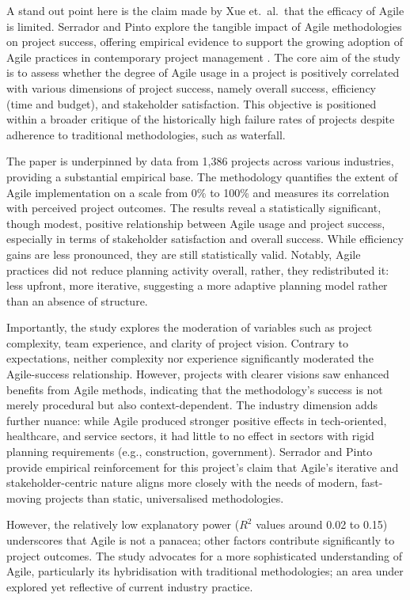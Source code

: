 \documentclass{report}
\begin{document}
A stand out point here is the claim made by Xue et.\ al.\ that the efficacy of Agile is limited. 
Serrador and Pinto explore the tangible impact of Agile methodologies on project success, offering empirical evidence to support the growing adoption of Agile practices in contemporary project management \parencite{serradorDoesAgileWork2015}. 
The core aim of the study is to assess whether the degree of Agile usage in a project is positively correlated with various dimensions of project success, namely overall success, efficiency (time and budget), and stakeholder satisfaction. 
This objective is positioned within a broader critique of the historically high failure rates of projects despite adherence to traditional methodologies, such as waterfall.

The paper is underpinned by data from 1,386 projects across various industries, providing a substantial empirical base. 
The methodology quantifies the extent of Agile implementation on a scale from 0\% to 100\% and measures its correlation with perceived project outcomes. 
The results reveal a statistically significant, though modest, positive relationship between Agile usage and project success, especially in terms of stakeholder satisfaction and overall success. 
While efficiency gains are less pronounced, they are still statistically valid. Notably, Agile practices did not reduce planning activity overall, rather, they redistributed it: less upfront, more iterative, suggesting a more adaptive planning model rather than an absence of structure.

Importantly, the study explores the moderation of variables such as project complexity, team experience, and clarity of project vision. 
Contrary to expectations, neither complexity nor experience significantly moderated the Agile-success relationship. 
However, projects with clearer visions saw enhanced benefits from Agile methods, indicating that the methodology's success is not merely procedural but also context-dependent. 
The industry dimension adds further nuance: while Agile produced stronger positive effects in tech-oriented, healthcare, and service sectors, it had little to no effect in sectors with rigid planning requirements (e.g., construction, government). 
Serrador and Pinto provide empirical reinforcement for this project's claim that Agile's iterative and stakeholder-centric nature aligns more closely with the needs of modern, fast-moving projects than static, universalised methodologies.

However, the relatively low explanatory power ($R^2$ values around 0.02 to 0.15) underscores that Agile is not a panacea; other factors contribute significantly to project outcomes.
The study advocates for a more sophisticated understanding of Agile, particularly its hybridisation with traditional methodologies; an area under explored yet reflective of current industry practice.
\end{document}
